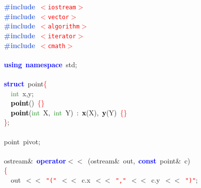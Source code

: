 \noindent
\mbox{}\textbf{\textcolor{RoyalBlue}{\#include}}\ \texttt{\textcolor{Red}{$<$iostream$>$}} \\
\mbox{}\textbf{\textcolor{RoyalBlue}{\#include}}\ \texttt{\textcolor{Red}{$<$vector$>$}} \\
\mbox{}\textbf{\textcolor{RoyalBlue}{\#include}}\ \texttt{\textcolor{Red}{$<$algorithm$>$}} \\
\mbox{}\textbf{\textcolor{RoyalBlue}{\#include}}\ \texttt{\textcolor{Red}{$<$iterator$>$}} \\
\mbox{}\textbf{\textcolor{RoyalBlue}{\#include}}\ \texttt{\textcolor{Red}{$<$cmath$>$}} \\
\mbox{} \\
\mbox{}\textbf{\textcolor{Blue}{using}}\ \textbf{\textcolor{Blue}{namespace}}\ std\textcolor{BrickRed}{;} \\
\mbox{} \\
\mbox{}\textbf{\textcolor{Blue}{struct}}\ point\textcolor{Red}{\{} \\
\mbox{}\ \ \textcolor{ForestGreen}{int}\ x\textcolor{BrickRed}{,}y\textcolor{BrickRed}{;} \\
\mbox{}\ \ \textbf{\textcolor{Black}{point}}\textcolor{BrickRed}{()}\ \textcolor{Red}{\{\}} \\
\mbox{}\ \ \textbf{\textcolor{Black}{point}}\textcolor{BrickRed}{(}\textcolor{ForestGreen}{int}\ X\textcolor{BrickRed}{,}\ \textcolor{ForestGreen}{int}\ Y\textcolor{BrickRed}{)}\ \textcolor{BrickRed}{:}\ \textbf{\textcolor{Black}{x}}\textcolor{BrickRed}{(}X\textcolor{BrickRed}{),}\ \textbf{\textcolor{Black}{y}}\textcolor{BrickRed}{(}Y\textcolor{BrickRed}{)}\ \textcolor{Red}{\{\}} \\
\mbox{}\textcolor{Red}{\}}\textcolor{BrickRed}{;} \\
\mbox{} \\
\mbox{}point\ pivot\textcolor{BrickRed}{;} \\
\mbox{} \\
\mbox{}ostream\textcolor{BrickRed}{\&}\ \textbf{\textcolor{Blue}{operator}}\textcolor{BrickRed}{$<$$<$}\ \textcolor{BrickRed}{(}ostream\textcolor{BrickRed}{\&}\ out\textcolor{BrickRed}{,}\ \textbf{\textcolor{Blue}{const}}\ point\textcolor{BrickRed}{\&}\ c\textcolor{BrickRed}{)} \\
\mbox{}\textcolor{Red}{\{} \\
\mbox{}\ \ out\ \textcolor{BrickRed}{$<$$<$}\ \texttt{\textcolor{Red}{"{}("{}}}\ \textcolor{BrickRed}{$<$$<$}\ c\textcolor{BrickRed}{.}x\ \textcolor{BrickRed}{$<$$<$}\ \texttt{\textcolor{Red}{"{},"{}}}\ \textcolor{BrickRed}{$<$$<$}\ c\textcolor{BrickRed}{.}y\ \textcolor{BrickRed}{$<$$<$}\ \texttt{\textcolor{Red}{"{})"{}}}\textcolor{BrickRed}{;} \\
